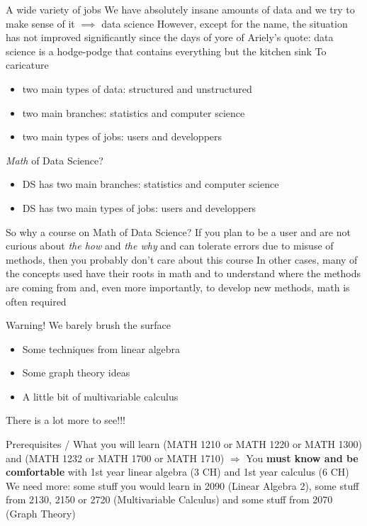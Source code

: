 \documentclass[aspectratio=169]{beamer}\usepackage[]{graphicx}\usepackage[]{xcolor}
\begin{document}
\begin{frame}{A wide variety of jobs}
We have absolutely insane amounts of data and we try to make sense of it
\vfill
$\implies$ data science
\vfill
However, except for the name, the situation has not improved significantly since the days of yore of Ariely's quote: data science is a hodge-podge that contains everything but the kitchen sink
\vfill
To caricature
\begin{itemize}
\item two main types of data: structured and unstructured
\item two main branches: statistics and computer science
\item two main types of jobs: users and developpers
\end{itemize}
\end{frame}

\begin{frame}{\textit{Math} of Data Science?}
\begin{itemize}
\item DS has two main branches: statistics and computer science
\item DS has two main types of jobs: users and developpers
\end{itemize}
\vfill
So why a course on Math of Data Science?
\vfill
If you plan to be a user and are not curious about \textit{the how} and \textit{the why} and can tolerate errors due to misuse of methods, then you probably don't care about this course
\vfill
In other cases, many of the concepts used have their roots in math and to understand where the methods are coming from and, even more importantly, to develop new methods, math is often required
\end{frame}

\begin{frame}{Warning! We barely brush the surface}
\begin{itemize}
\item Some techniques from linear algebra
\vfill
\item Some graph theory ideas
\vfill
\item A little bit of multivariable calculus
\end{itemize}
\vfill
There is a lot more to see!!!
\end{frame}

\begin{frame}{Prerequisites / What you will learn}
\bbullet (MATH 1210 or MATH 1220 or MATH 1300) and (MATH 1232 or MATH 1700 or MATH 1710)
\vfill
$\Rightarrow$ You \textbf{must know and be comfortable} with 1st year linear algebra (3 CH) and 1st year calculus (6 CH)
\vfill
\bbullet We need more: some stuff you would learn in 2090 (Linear Algebra 2), some stuff from 2130, 2150 or 2720 (Multivariable Calculus) and some stuff from 2070 (Graph Theory)
\end{frame}
\end{document}
